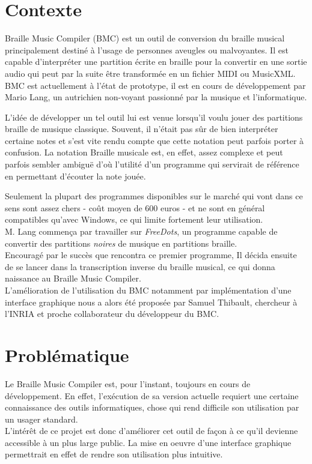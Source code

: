 \section*{Contexte}
Braille Music Compiler (BMC) est un outil de conversion du braille musical principalement destiné à l'usage de personnes aveugles ou malvoyantes. Il est capable d'interpréter une partition écrite en braille pour la convertir en une sortie audio qui peut par la suite être transformée en un fichier  MIDI ou MusicXML.\\

  BMC est actuellement à l'état de prototype, il est en cours de développement par Mario Lang, un autrichien non-voyant passionné par la musique et l'informatique.

  L'idée de développer un tel outil lui est venue lorsqu'il voulu jouer des partitions braille de musique classique. Souvent, il n'était pas sûr de bien interpréter certaine notes et s'est vite rendu compte que cette notation peut parfois porter à confusion. La notation Braille musicale est, en effet, assez complexe et peut parfois sembler ambiguë d'où l'utilité d'un programme qui servirait de référence en permettant d'écouter la note jouée. 
  
  Seulement la plupart des programmes disponibles sur le marché qui vont dans ce sens sont assez chers - coût moyen de 600 euros - et ne sont en général compatibles qu'avec Windows, ce qui limite fortement leur utilisation.\\
 
  M. Lang commença par travailler sur \textit{FreeDots}, un programme capable de convertir des partitions \textit{noires} de musique en partitions braille.\\
  Encouragé par le succès que rencontra ce premier programme, Il décida ensuite de se lancer dans la transcription inverse du braille musical, ce qui donna naissance au Braille Music Compiler. \\
  
  L'amélioration de l'utilisation du BMC notamment par implémentation d'une interface graphique nous a alors été proposée par Samuel Thibault, chercheur à l'INRIA et proche collaborateur du développeur du BMC. 
  
  
 
\section*{Problématique}
Le Braille Music Compiler est, pour l'instant, toujours en cours de développement. En effet, l'exécution de sa version actuelle requiert une certaine connaissance des outils informatiques, chose qui rend difficile son utilisation par un usager standard.\\
L'intérêt de ce projet est donc d'améliorer cet outil de façon à ce qu'il devienne accessible à un plus large public. La mise en oeuvre d'une interface graphique permettrait en effet de rendre son utilisation plus intuitive.\\

